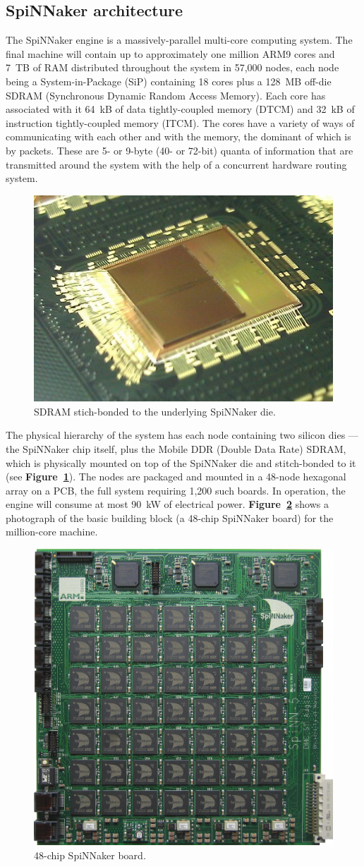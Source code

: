 \documentclass[a4paper, 11pt]{article}
\begin{document}
\subsection{SpiNNaker architecture}

The SpiNNaker engine is a massively-parallel multi-core computing system. The final machine will contain up to approximately one million ARM9 cores and 7~TB of RAM distributed throughout the system in 57,000 nodes, each node being a System-in-Package (SiP) containing 18 cores plus a 128~MB off-die SDRAM (Synchronous Dynamic Random Access Memory). Each core has associated with it 64~kB of data tightly-coupled memory (DTCM) and 32~kB of instruction tightly-coupled memory (ITCM). The cores have a variety of ways of communicating with each other and with the memory, the dominant of which is by packets. These are 5- or 9-byte (40- or 72-bit) quanta of information that are transmitted around the system with the help of a concurrent hardware routing system. 

\begin{figure}[htbp]
	\centering
	\includegraphics[width=0.25\linewidth]{images/spinnaker_die.jpg}
	\caption{SDRAM stich-bonded to the underlying SpiNNaker die.}
	\label{fig:spinnaker_die}
\end{figure}

The physical hierarchy of the system has each node containing two silicon dies --- the SpiNNaker chip itself, plus the Mobile DDR (Double Data Rate) SDRAM, which is physically mounted on top of the SpiNNaker die and stitch-bonded to it (see \textbf{Figure~\ref{fig:spinnaker_die}}). The nodes are packaged and mounted in a 48-node hexagonal array on a PCB, the full system requiring 1,200 such boards. In operation, the engine will consume at most 90~kW of electrical power. \textbf{Figure~\ref{fig:spin5}} shows a photograph of the basic building block (a 48-chip SpiNNaker board) for the million-core machine.

\begin{figure}[htbp]
	\centering
	\includegraphics[width=0.45\linewidth]{images/spin5.jpg}
	\caption{48-chip SpiNNaker board.}
	\label{fig:spin5}
\end{figure}
\end{document}
